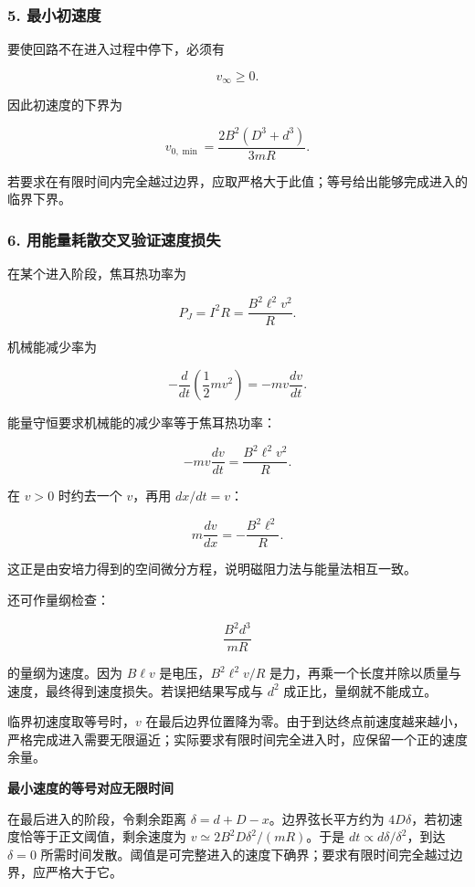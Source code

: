 \documentclass[12pt,a4paper,UTF8]{ctexart}
\begin{document}
\subsubsection{5. 最小初速度}\label{ux6700ux5c0fux521dux901fux5ea6}

要使回路不在进入过程中停下，必须有

\[
v_\infty\ge0.
\]

因此初速度的下界为

\[
\boxed{
v_{0,\min}=\frac{2B^2(D^3+d^3)}{3mR}
}.
\]

若要求在有限时间内完全越过边界，应取严格大于此值；等号给出能够完成进入的临界下界。

\subsubsection{6.
用能量耗散交叉验证速度损失}\label{ux7528ux80fdux91cfux8017ux6563ux4ea4ux53c9ux9a8cux8bc1ux901fux5ea6ux635fux5931}

在某个进入阶段，焦耳热功率为

\[
P_J=I^2R
=\frac{B^2\ell^2v^2}{R}.
\]

机械能减少率为

\[
-\frac{d}{dt}\left(\frac12mv^2\right)
=-mv\frac{dv}{dt}.
\]

能量守恒要求机械能的减少率等于焦耳热功率：

\[
-mv\frac{dv}{dt}
=\frac{B^2\ell^2v^2}{R}.
\]

在 \(v>0\) 时约去一个 \(v\)，再用 \(dx/dt=v\)：

\[
m\frac{dv}{dx}=-\frac{B^2\ell^2}{R}.
\]

这正是由安培力得到的空间微分方程，说明磁阻力法与能量法相互一致。

还可作量纲检查：

\[
\frac{B^2d^3}{mR}
\]

的量纲为速度。因为 \(B\ell v\) 是电压，\(B^2\ell^2v/R\)
是力，再乘一个长度并除以质量与速度，最终得到速度损失。若误把结果写成与
\(d^2\) 成正比，量纲就不能成立。

临界初速度取等号时，\(v\)
在最后边界位置降为零。由于到达终点前速度越来越小，严格完成进入需要无限逼近；实际要求有限时间完全进入时，应保留一个正的速度余量。

\textbf{最小速度的等号对应无限时间}

在最后进入的阶段，令剩余距离 \(\delta=d+D-x\)。边界弦长平方约为
\(4D\delta\)，若初速度恰等于正文阈值，剩余速度为
\(v\simeq2B^2D\delta^2/(mR)\)。于是 \(dt\propto d\delta/\delta^2\)，到达
\(\delta=0\)
所需时间发散。阈值是可完整进入的速度下确界；要求有限时间完全越过边界，应严格大于它。
\end{document}
